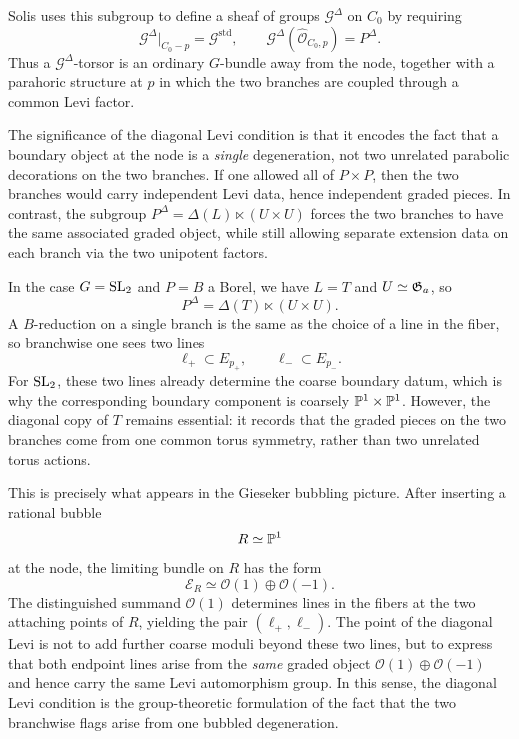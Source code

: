 \documentclass[12pt]{article}
\begin{document}
Solis uses this subgroup to define a sheaf of groups $\mathcal G^\Delta$ on $C_0$ by requiring
\[
\mathcal G^\Delta|_{C_0-p}=\mathcal G^{\mathrm{std}},
\qquad
\mathcal G^\Delta(\widehat{\mathcal O}_{C_0,p})=P^\Delta.
\]
Thus a $\mathcal G^\Delta$-torsor is an ordinary $G$-bundle away from the node, together with a parahoric structure at $p$ in which the two branches are coupled through a common Levi factor.

The significance of the diagonal Levi condition is that it encodes the fact that a boundary object at the node is a \emph{single} degeneration, not two unrelated parabolic decorations on the two branches. If one allowed all of $P\times P$, then the two branches would carry independent Levi data, hence independent graded pieces. In contrast, the subgroup $P^\Delta=\Delta(L)\ltimes (U\times U)$ forces the two branches to have the same associated graded object, while still allowing separate extension data on each branch via the two unipotent factors.

In the case $G=\operatorname{SL}_2$ and $P=B$ a Borel, we have $L=T$ and $U\simeq \mathfrak{G}_a$, so
\[
P^\Delta=\Delta(T)\ltimes (U\times U).
\]
A $B$-reduction on a single branch is the same as the choice of a line in the fiber, so branchwise one sees two lines
\[
\ell_+\subset E_{p_+},
\qquad
\ell_-\subset E_{p_-}.
\]
For $\operatorname{SL}_2$, these two lines already determine the coarse boundary datum, which is why the corresponding boundary component is coarsely $\mathbb{P}^1\times \mathbb{P}^1$. However, the diagonal copy of $T$ remains essential: it records that the graded pieces on the two branches come from one common torus symmetry, rather than two unrelated torus actions.

This is precisely what appears in the Gieseker bubbling picture. After inserting a rational bubble
\[
R\simeq \mathbb{P}^1
\]
at the node, the limiting bundle on $R$ has the form
\[
\mathcal E_R\simeq \mathcal O(1)\oplus \mathcal O(-1).
\]
The distinguished summand $\mathcal O(1)$ determines lines in the fibers at the two attaching points of $R$, yielding the pair $(\ell_+,\ell_-)$. The point of the diagonal Levi is not to add further coarse moduli beyond these two lines, but to express that both endpoint lines arise from the \emph{same} graded object $\mathcal O(1)\oplus \mathcal O(-1)$ and hence carry the same Levi automorphism group. In this sense, the diagonal Levi condition is the group-theoretic formulation of the fact that the two branchwise flags arise from one bubbled degeneration.
\end{document}
